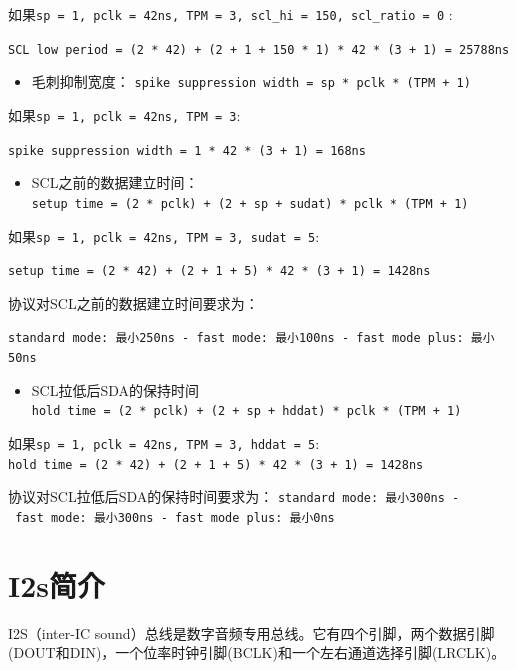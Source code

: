 \documentclass[
  12pt,
]{book}
\providecommand{\tightlist}{%
  \setlength{\itemsep}{0pt}\setlength{\parskip}{0pt}}
\begin{document}
如果\texttt{sp\ =\ 1,\ pclk\ =\ 42ns,\ TPM\ =\ 3,\ scl\_hi\ =\ 150,\ scl\_ratio\ =\ 0} :

\texttt{SCL\ low\ period\ =\ (2\ *\ 42)\ +\ (2\ +\ 1\ +\ 150\ *\ 1)\ *\ 42\ *\ (3\ +\ 1)\ =\ 25788ns}

\begin{itemize}
\tightlist
\item
  毛刺抑制宽度： \texttt{spike\ suppression\ width\ =\ sp\ *\ pclk\ *\ (TPM\ +\ 1)}
\end{itemize}

如果\texttt{sp\ =\ 1,\ pclk\ =\ 42ns,\ TPM\ =\ 3}:

\texttt{spike\ suppression\ width\ =\ 1\ *\ 42\ *\ (3\ +\ 1)\ =\ 168ns}

\begin{itemize}
\tightlist
\item
  SCL之前的数据建立时间：\texttt{setup\ time\ =\ (2\ *\ pclk)\ +\ (2\ +\ sp\ +\ sudat)\ *\ pclk\ *\ (TPM\ +\ 1)}
\end{itemize}

如果\texttt{sp\ =\ 1,\ pclk\ =\ 42ns,\ TPM\ =\ 3,\ sudat\ =\ 5}:

\texttt{setup\ time\ =\ (2\ *\ 42)\ +\ (2\ +\ 1\ +\ 5)\ *\ 42\ *\ (3\ +\ 1)\ =\ 1428ns}

协议对SCL之前的数据建立时间要求为：

\texttt{standard\ mode:\ 最小250ns\ -\ fast\ mode:\ 最小100ns\ -\ fast\ mode\ plus:\ 最小50ns}

\begin{itemize}
\tightlist
\item
  SCL拉低后SDA的保持时间 \texttt{hold\ time\ =\ (2\ *\ pclk)\ +\ (2\ +\ sp\ +\ hddat)\ *\ pclk\ *\ (TPM\ +\ 1)}
\end{itemize}

如果\texttt{sp\ =\ 1,\ pclk\ =\ 42ns,\ TPM\ =\ 3,\ hddat\ =\ 5}: \texttt{hold\ time\ =\ (2\ *\ 42)\ +\ (2\ +\ 1\ +\ 5)\ *\ 42\ *\ (3\ +\ 1)\ =\ 1428ns}

协议对SCL拉低后SDA的保持时间要求为： \texttt{standard\ mode:\ 最小300ns\ -\ fast\ mode:\ 最小300ns\ -\ fast\ mode\ plus:\ 最小0ns}

\hypertarget{ch-I2s}{%
\chapter{I2s简介}\label{ch-I2s}}

I2S（inter-IC sound）总线是数字音频专用总线。它有四个引脚，两个数据引脚(DOUT和DIN)，一个位率时钟引脚(BCLK)和一个左右通道选择引脚(LRCLK)。
\end{document}
